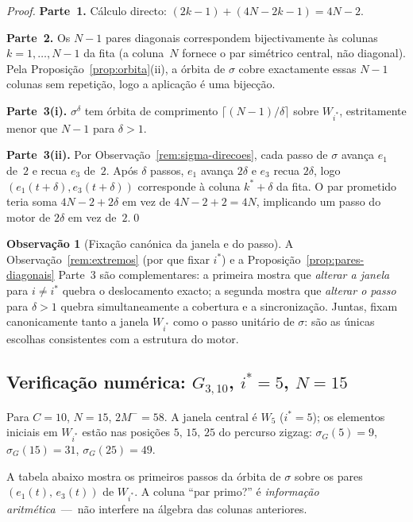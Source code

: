 \documentclass[12pt, a4paper]{article}
\theoremstyle{plain}
\theoremstyle{definition}
\newtheorem{remark}[theorem]{Observação}
\theoremstyle{remark}
\begin{document}
	\begin{proof}
		\textbf{Parte~1.}  Cálculo directo:
		$(2k-1)+(4N-2k-1)=4N-2$.\checkmark
		
		\textbf{Parte~2.}  Os $N-1$ pares diagonais correspondem
		bijectivamente às colunas $k=1,\ldots,N-1$ da fita (a
		coluna~$N$ fornece o par simétrico central, não diagonal).  Pela
		Proposição~\ref{prop:orbita}(ii), a órbita de $\sigma$ cobre
		exactamente essas $N-1$ colunas sem repetição, logo a aplicação
		é uma bijecção.\checkmark
		
		\textbf{Parte~3(i).}  $\sigma^\delta$ tem órbita de comprimento
		$\lceil(N-1)/\delta\rceil$ sobre $W_{i^*}$, estritamente menor
		que $N-1$ para $\delta>1$.
		
		\textbf{Parte~3(ii).}  Por
		Observação~\ref{rem:sigma-direcoes}, cada passo de $\sigma$
		avança $e_1$ de~$2$ e recua $e_3$ de~$2$.  Após $\delta$ passos,
		$e_1$ avança $2\delta$ e $e_3$ recua $2\delta$, logo
		$(e_1(t{+}\delta),e_3(t{+}\delta))$ corresponde à
		coluna $k^*+\delta$ da fita.  O par prometido teria soma
		$4N-2+2\delta$ em vez de $4N-2+2=4N$, implicando um passo
		do motor de $2\delta$ em vez de~$2$.\qed
	\end{proof}
	
	\begin{remark}[Fixação canónica da janela e do passo]
		\label{rem:canonico}
		A Observação~\ref{rem:extremos} (por que fixar $i^*$) e a
		Proposição~\ref{prop:pares-diagonais} Parte~3 são complementares:
		a primeira mostra que \emph{alterar a janela} para $i\neq i^*$
		quebra o deslocamento exacto; a segunda mostra que \emph{alterar
			o passo} para $\delta>1$ quebra simultaneamente a cobertura e a
		sincronização.  Juntas, fixam canonicamente tanto a janela
		$W_{i^*}$ como o passo unitário de $\sigma$: são as únicas
		escolhas consistentes com a estrutura do motor.
	\end{remark}
	
	\subsection{Verificação numérica: $G_{3,10}$, $i^*=5$, $N=15$}
	\label{subsec:verif-sigma}
	
	Para $C=10$, $N=15$, $2M^-=58$.
	A janela central é $W_5$ ($i^*=5$); os elementos iniciais em
	$W_{i^*}$ estão nas posições $5,\,15,\,25$ do percurso zigzag:
	$\sigma_G(5)=9$, $\sigma_G(15)=31$, $\sigma_G(25)=49$.
	
	A tabela abaixo mostra os primeiros passos da órbita de $\sigma$
	sobre os pares $(e_1(t),\,e_3(t))$ de $W_{i^*}$.
	A coluna ``par primo?'' é \emph{informação aritmética}~---~não
	interfere na álgebra das colunas anteriores.
	
\end{document}
